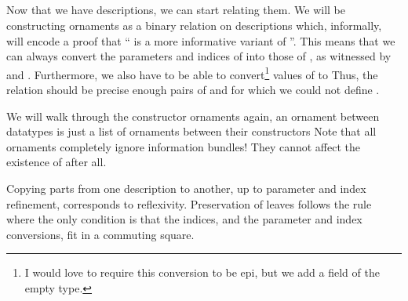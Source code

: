 




\subsection{}
Now that we have descriptions, we can start relating them. We will be constructing ornaments as a binary relation on descriptions
which, informally, will encode a proof that `` is a more informative variant of ''. This means that we can always convert the parameters and indices of  into those of , as witnessed by  and . Furthermore, we also have to be able to convert\footnote{I would love to require this conversion to be epi, but we add a field of the empty type.} values of  to 
Thus, the relation should be precise enough pairs of  and  for which we could not define .

We will walk through the constructor ornaments
again, an ornament between datatypes is just a list of ornaments between their constructors
Note that all ornaments completely ignore information bundles! They cannot affect the existence of  after all.

Copying parts from one description to another, up to parameter and index refinement, corresponds to reflexivity. Preservation of leaves follows the rule
where the only condition is that the indices, and the parameter and index conversions, fit in a commuting square.

